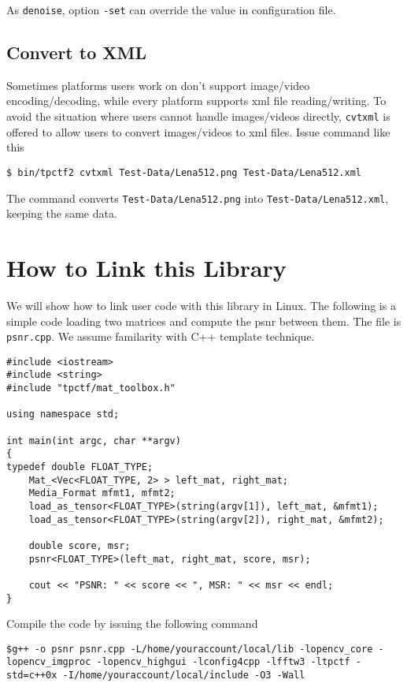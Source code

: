 \documentclass[a4paper,5pt]{article}
\begin{document}
As \lstinline{denoise}, option \lstinline{-set} can  override the value in configuration file.

\subsection{Convert to XML}

Sometimes platforms users work on don't support image/video encoding/decoding, while every platform supports xml file reading/writing. To avoid the situation where users cannot handle images/videos directly, \lstinline{cvtxml} is offered to allow users to convert images/videos to xml files. Issue command like this

\lstinline{$ bin/tpctf2 cvtxml Test-Data/Lena512.png Test-Data/Lena512.xml}

The command converts \lstinline{Test-Data/Lena512.png} into \lstinline{Test-Data/Lena512.xml}, keeping the same data.

\section{How to Link this Library}
We will show how to link user code with this library in Linux. The following is a simple code loading two matrices and compute the psnr between them. The file is \lstinline{psnr.cpp}. We assume familarity with C++ template technique.

\begin{lstlisting}
#include <iostream>
#include <string>
#include "tpctf/mat_toolbox.h"

using namespace std;

int main(int argc, char **argv)
{
typedef double FLOAT_TYPE;
	Mat_<Vec<FLOAT_TYPE, 2> > left_mat, right_mat;
	Media_Format mfmt1, mfmt2;
	load_as_tensor<FLOAT_TYPE>(string(argv[1]), left_mat, &mfmt1);
	load_as_tensor<FLOAT_TYPE>(string(argv[2]), right_mat, &mfmt2);

	double score, msr;
	psnr<FLOAT_TYPE>(left_mat, right_mat, score, msr);

	cout << "PSNR: " << score << ", MSR: " << msr << endl;
}
\end{lstlisting}

Compile the code by issuing the following command

\lstinline{$g++ -o psnr psnr.cpp -L/home/youraccount/local/lib -lopencv_core -lopencv_imgproc -lopencv_highgui -lconfig4cpp -lfftw3 -ltpctf -std=c++0x -I/home/youraccount/local/include -O3 -Wall}
\end{document}
